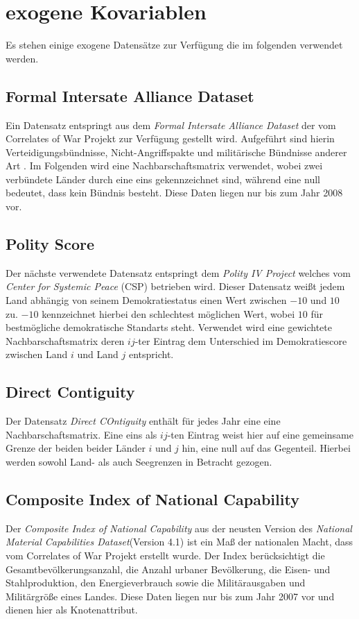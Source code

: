 \documentclass[a4paper,ngerman,oneside,titlepage,bibliography=totoc,11pt]{scrreprt}
\begin{document}
\section{exogene Kovariablen}
Es stehen einige exogene Datensätze zur Verfügung die im folgenden verwendet werden.

\subsection{Formal Intersate Alliance Dataset}
Ein Datensatz entspringt aus dem \emph{Formal Intersate Alliance Dataset} \cite{alliance} der vom Correlates of War Projekt zur Verfügung gestellt wird. Aufgeführt sind hierin Verteidigungsbündnisse, Nicht-Angriffspakte und militärische Bündnisse anderer Art . 
Im Folgenden wird  eine Nachbarschaftsmatrix verwendet, wobei zwei verbündete Länder durch eine eins gekennzeichnet sind, während eine null bedeutet, dass kein Bündnis besteht. Diese Daten liegen nur bis zum Jahr 2008 vor.

\subsection{Polity Score}
Der nächste verwendete Datensatz entspringt dem \emph{Polity IV Project} welches vom \emph{Center for Systemic Peace} (CSP) \cite{polity} betrieben wird. Dieser Datensatz weißt jedem Land abhängig von seinem Demokratiestatus einen Wert zwischen $-10$ und $10$ zu. $-10$ kennzeichnet hierbei den schlechtest möglichen Wert, wobei $10$ für bestmögliche demokratische Standarts steht. Verwendet wird eine gewichtete Nachbarschaftsmatrix deren $ij$-ter Eintrag dem Unterschied im Demokratiescore zwischen Land $i$ und Land $j$ entspricht.

\subsection{Direct Contiguity}
Der Datensatz \emph{Direct COntiguity} enthält für jedes Jahr eine eine Nachbarschaftsmatrix. Eine eins als $ij$-ten Eintrag weist hier auf eine gemeinsame Grenze der beiden beider Länder $i$ und $j$ hin, eine null auf das Gegenteil. Hierbei werden sowohl Land- als auch Seegrenzen in Betracht gezogen.

\subsection{Composite Index of National Capability}
Der \emph{Composite Index of National Capability} aus der neusten Version des \emph{National Material Capabilities Dataset}(Version 4.1)  \cite{CINC} ist ein Maß der nationalen Macht, dass vom Correlates of War Projekt erstellt wurde. Der Index berücksichtigt die Gesamtbevölkerungsanzahl, die Anzahl urbaner Bevölkerung, die Eisen- und Stahlproduktion, den Energieverbrauch  sowie die Militärausgaben und Militärgröße eines Landes. Diese Daten liegen nur bis zum Jahr 2007 vor und dienen hier als Knotenattribut.
\end{document}
